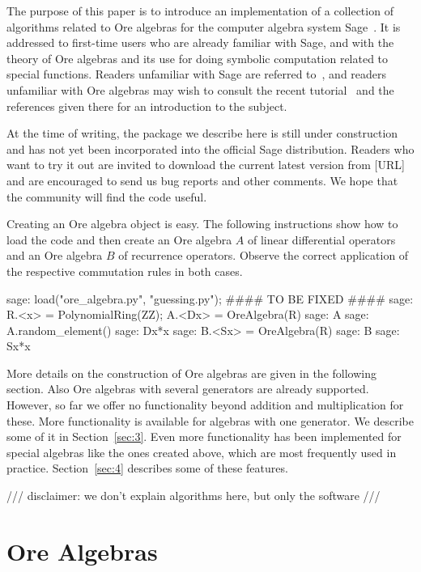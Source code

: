 \documentclass{amsart}
\begin{document}
The purpose of this paper is to introduce an implementation of a collection of
algorithms related to Ore algebras for the computer algebra system
Sage~\cite{sage}. It is addressed to first-time users who are already familiar
with Sage, and with the theory of Ore algebras and its use for doing symbolic
computation related to special functions. Readers unfamiliar with Sage are referred
to~\cite{sage}, and readers unfamiliar with Ore algebras may wish to consult the
recent tutorial~\cite{kauers13} and the references given there for an introduction to
the subject.

At the time of writing, the package we describe here is still under construction
and has not yet been incorporated into the official Sage distribution. Readers
who want to try it out are invited to download the current latest version from 
[URL] and are encouraged to send us bug reports and other comments. We hope 
that the community will find the code useful.

Creating an Ore algebra object is easy. The following instructions show how to 
load the code and then create an Ore algebra $A$ of linear differential operators
and an Ore algebra $B$ of recurrence operators. Observe the correct application
of the respective commutation rules in both cases. 

\begin{sageexample}
  sage: load("ore_algebra.py", "guessing.py");  #### TO BE FIXED ####
  sage: R.<x> = PolynomialRing(ZZ); A.<Dx> = OreAlgebra(R)
  sage: A
  sage: A.random_element()
  sage: Dx*x
  sage: B.<Sx> = OreAlgebra(R)
  sage: B
  sage: Sx*x
\end{sageexample}

More details on the construction of Ore algebras are given in the following section.
Also Ore algebras with several generators are already supported. However, so far we offer
no functionality beyond addition and multiplication for these. More functionality 
is available for algebras with one generator. We describe some of it in 
Section~\ref{sec:3}. Even more functionality has been implemented for special 
algebras like the ones created above, which are most frequently used in practice. 
Section~\ref{sec:4} describes some of these features. 

/// disclaimer: we don't explain algorithms here, but only the software /// 

\section{Ore Algebras}
\end{document}
